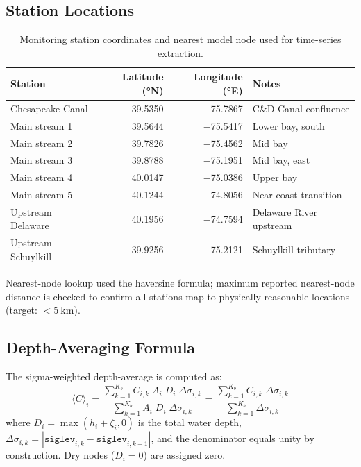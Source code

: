 \documentclass[11pt]{article}
\begin{document}
\subsection*{Station Locations}

\begin{table}[h]
\centering
\caption{Monitoring station coordinates and nearest model node used for
         time-series extraction.}
\label{tab:stations}
\begin{tabular}{lrrl}
\toprule
Station & Latitude (°N) & Longitude (°E) & Notes \\
\midrule
Chesapeake Canal     & 39.5350 & $-$75.7867 & C\&D Canal confluence \\
Main stream 1        & 39.5644 & $-$75.5417 & Lower bay, south \\
Main stream 2        & 39.7826 & $-$75.4562 & Mid bay \\
Main stream 3        & 39.8788 & $-$75.1951 & Mid bay, east \\
Main stream 4        & 40.0147 & $-$75.0386 & Upper bay \\
Main stream 5        & 40.1244 & $-$74.8056 & Near-coast transition \\
Upstream Delaware    & 40.1956 & $-$74.7594 & Delaware River upstream \\
Upstream Schuylkill  & 39.9256 & $-$75.2121 & Schuylkill tributary \\
\bottomrule
\end{tabular}
\end{table}

Nearest-node lookup used the haversine formula; maximum reported
nearest-node distance is checked to confirm all stations map to
physically reasonable locations (target: $< 5~\mathrm{km}$).

\subsection*{Depth-Averaging Formula}

The sigma-weighted depth-average is computed as:
\[
  \langle C \rangle_i
  = \frac{\displaystyle\sum_{k=1}^{K_b} C_{i,k}\;A_i\;D_i\;\Delta\sigma_{i,k}}
         {\displaystyle\sum_{k=1}^{K_b} A_i\;D_i\;\Delta\sigma_{i,k}}
  = \frac{\displaystyle\sum_{k=1}^{K_b} C_{i,k}\;\Delta\sigma_{i,k}}
         {\displaystyle\sum_{k=1}^{K_b} \Delta\sigma_{i,k}}
\]
where $D_i = \max(h_i + \zeta_i, 0)$ is the total water depth,
$\Delta\sigma_{i,k} = |\texttt{siglev}_{i,k} - \texttt{siglev}_{i,k+1}|$,
and the denominator equals unity by construction.  Dry nodes ($D_i = 0$)
are assigned zero.
\end{document}
